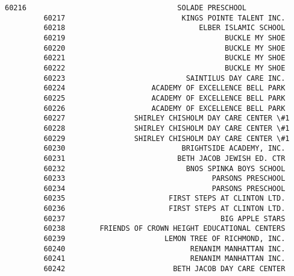 \documentclass[11pt]{article}
\begin{document}
\begin{Verbatim}[commandchars=\\\{\}]
         60216                                   SOLADE PRESCHOOL   
         60217                           KINGS POINTE TALENT INC.   
         60218                               ELBER ISLAMIC SCHOOL   
         60219                                     BUCKLE MY SHOE   
         60220                                     BUCKLE MY SHOE   
         60221                                     BUCKLE MY SHOE   
         60222                                     BUCKLE MY SHOE   
         60223                            SAINTILUS DAY CARE INC.   
         60224                    ACADEMY OF EXCELLENCE BELL PARK   
         60225                    ACADEMY OF EXCELLENCE BELL PARK   
         60226                    ACADEMY OF EXCELLENCE BELL PARK   
         60227                SHIRLEY CHISHOLM DAY CARE CENTER \#1   
         60228                SHIRLEY CHISHOLM DAY CARE CENTER \#1   
         60229                SHIRLEY CHISHOLM DAY CARE CENTER \#1   
         60230                           BRIGHTSIDE ACADEMY, INC.   
         60231                          BETH JACOB JEWISH ED. CTR   
         60232                            BNOS SPINKA BOYS SCHOOL   
         60233                                  PARSONS PRESCHOOL   
         60234                                  PARSONS PRESCHOOL   
         60235                        FIRST STEPS AT CLINTON LTD.   
         60236                        FIRST STEPS AT CLINTON LTD.   
         60237                                    BIG APPLE STARS   
         60238        FRIENDS OF CROWN HEIGHT EDUCATIONAL CENTERS   
         60239                       LEMON TREE OF RICHMOND, INC.   
         60240                             RENANIM MANHATTAN INC.   
         60241                             RENANIM MANHATTAN INC.   
         60242                         BETH JACOB DAY CARE CENTER   
         

\end{Verbatim}
\end{document}

